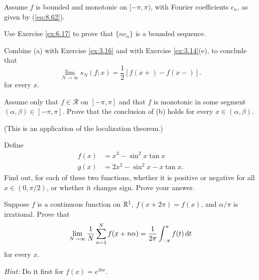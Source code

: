 \begin{myexercise}
    \label{ex:8.17}
    Assume $f$ is bounded and monotonic on $[-\pi, \pi)$,
    with Fourier coefficients $c_n$, as given by (\ref{eq:8.62}).
    \begin{asparaenum}[(a)]
        \item Use Exercise \ref{ex:6.17} to prove that $\{nc_n\}$ is a bounded sequence.
        \item Combine (a) with Exercise \ref{ex:3.16} and with Exercise \ref{ex:3.14}(e), to conclude that
        \begin{equation*}
            \lim_{N \to \infty} s_N(f;x) = \frac{1}{2}\left[ f(x+)-f(x-) \right].
        \end{equation*}
        for every $x$.
        \item Assume only that $f \in \mathscr{R}$ on $[-\pi,\pi]$ and that $f$ is monotonic in some segment
        $(\alpha, \beta) \in  [-\pi, \pi]$.
        Prove that the conclusion of (b) holds for every $x \in (\alpha, \beta)$.
    \end{asparaenum}
    (This is an application of the localization theorem.)
\end{myexercise}


\begin{myexercise}
    \label{ex:8.18}
    Define
    \begin{align*}
        f(x) & = x^3 - \sin^2 x \tan x      \\
        g(x) & = 2x^2 - \sin^2 x - x\tan x.
    \end{align*}
    Find out, for each of these two functions,
    whether it is positive or negative for all $x \in (0, \pi/2)$,
    or whether it changes sign.
    Prove your answer.
\end{myexercise}


\begin{myexercise}
    \label{ex:8.19}
    Suppose $f$ is a continuous function on ${\protect\mathbb R}^1$,
    $f(x + 2\pi) = f(x)$, and $\alpha/\pi$ is irrational.
    Prove that
    \begin{equation*}
        \lim_{N \to \infty} \frac{1}{N} \sum_{n=1}^{N} f(x+n\alpha) = \frac{1}{2\pi} \int_{-\pi}^{\pi} f(t) \d t
    \end{equation*}
    for every $x$.

    \emph{Hint:} Do it first for $f(x) = e^{ikx}$.
\end{myexercise}


